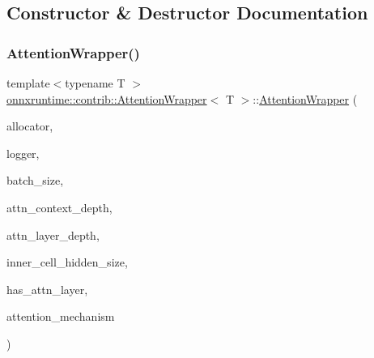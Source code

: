 \subsection{Constructor \& Destructor Documentation}
\mbox{\label{classonnxruntime_1_1contrib_1_1AttentionWrapper_a4d30d5692fafbfb82a282595e5b92756}} 
\subsubsection{\texorpdfstring{Attention\+Wrapper()}{AttentionWrapper()}}
{\footnotesize\ttfamily template$<$typename T $>$ \\
\mbox{\hyperlink{classonnxruntime_1_1contrib_1_1AttentionWrapper}{onnxruntime\+::contrib\+::\+Attention\+Wrapper}}$<$ T $>$\+::\mbox{\hyperlink{classonnxruntime_1_1contrib_1_1AttentionWrapper}{Attention\+Wrapper}} (\begin{DoxyParamCaption}\item[{\mbox{\hyperlink{namespaceonnxruntime_a6cdac724c5dcefded3a63f08dae58fda}{Allocator\+Ptr}}}]{allocator,  }\item[{const \mbox{\hyperlink{classonnxruntime_1_1logging_1_1Logger}{logging\+::\+Logger}} \&}]{logger,  }\item[{int}]{batch\+\_\+size,  }\item[{int}]{attn\+\_\+context\+\_\+depth,  }\item[{int}]{attn\+\_\+layer\+\_\+depth,  }\item[{int}]{inner\+\_\+cell\+\_\+hidden\+\_\+size,  }\item[{bool}]{has\+\_\+attn\+\_\+layer,  }\item[{const \mbox{\hyperlink{classonnxruntime_1_1contrib_1_1IAttentionMechanism}{I\+Attention\+Mechanism}}$<$ T $>$ \&}]{attention\+\_\+mechanism }\end{DoxyParamCaption})}

\mbox{\label{classonnxruntime_1_1contrib_1_1AttentionWrapper_acbf5eef271e8a8cac608d1d4b51f7b5c}} 
